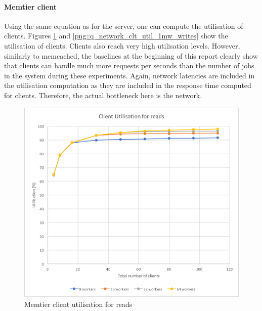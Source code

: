 \documentclass[11pt,a4paper]{article}
\begin{document}
\paragraph{Memtier client}
Using the same equation as for the server, one can compute the utilisation of clients. Figures \ref{png::q_network_clt_util_1mw_reads} and \ref{png::q_network_clt_util_1mw_writes} show the utilisation of clients. Clients also reach very high utilisation levels. However, similarly to memcached, the baselines at the beginning of this report clearly show that clients can handle much more requests per seconds than the number of jobs in the system during these experiments. Again, network latencies are included in the utilisation computation as they are included in the response time computed for clients. Therefore, the actual bottleneck here is the network.
\begin{figure}[!h]
    \centering
    \begin{minipage}[b]{.45\textwidth}
        \centering
        \includegraphics[width=\textwidth]{processing/graphics/q_network_clt_util_1mw_reads.png}
        \caption{Memtier client utilisation for reads}
        \label{png::q_network_clt_util_1mw_reads}
    \end{minipage}
    \qquad
    \begin{minipage}[b]{.45\textwidth}
        \centering

\end{minipage}
\end{figure}
\end{document}
